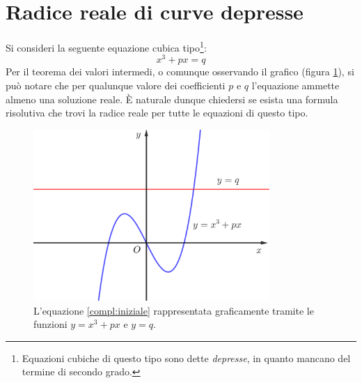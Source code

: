 \section{Radice reale di curve depresse}
\label{compl:cubidepresse}
Si consideri la seguente equazione cubica tipo\footnote{Equazioni cubiche di questo tipo sono dette \emph{depresse}, in quanto mancano del termine di secondo grado.}:
\begin{equation}
	\label{compl:iniziale}
	x^3+px=q
\end{equation}
Per il teorema dei valori intermedi, o comunque osservando il grafico (figura \ref{compl:cubica}), si può notare che per qualunque valore dei coefficienti $p$ e $q$ l'equazione ammette almeno una soluzione reale. È naturale dunque chiedersi se esista una formula risolutiva che trovi la radice reale per tutte le equazioni di questo tipo.

\begin{figure}[ht]
	\centering
	\includegraphics[width=0.8\textwidth]{grafici/cubica}
	\caption{L'equazione \ref{compl:iniziale} rappresentata graficamente tramite le funzioni $y=x^3+px$ e $y=q$.}
	\label{compl:cubica}
\end{figure}

